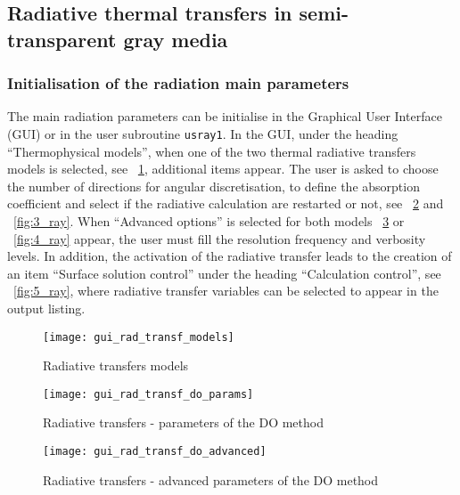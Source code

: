 {{\subsection{Radiative thermal transfers in semi-transparent gray media}
\subsubsection{Initialisation of the radiation main parameters}

The main radiation parameters can be initialise in the Graphical User Interface (GUI) or in the user subroutine \texttt{usray1}. In the GUI, under the heading ``Thermophysical models'', when one of the two thermal radiative transfers models is selected, see \figurename~\ref{fig:0_ray}, additional items appear. The user is asked to choose the number of directions for angular discretisation, to define the absorption coefficient and select if the radiative calculation are restarted or not, 
see \figurename~\ref{fig:1_ray} and \figurename~\ref{fig:3_ray}. When ``Advanced options'' is selected for both models \figurename~\ref{fig:2_ray} or \figurename~\ref{fig:4_ray} appear, the user must fill the resolution frequency and verbosity levels. In addition, the activation of the radiative transfer leads to the creation of an item ``Surface solution control'' under the heading ``Calculation control'', 
see \figurename~\ref{fig:5_ray}, where radiative transfer variables can be selected to appear in the output listing.

\begin{figure}[ht]
\begin{center}
\texttt{[image: gui\_rad\_transf\_models]}
\caption{Radiative transfers models}
\label{fig:0_ray}
\end{center}
\end{figure}

\begin{figure}[ht]
\begin{center}
\texttt{[image: gui\_rad\_transf\_do\_params]}
\caption{Radiative transfers - parameters of the DO method}
\label{fig:1_ray}
\end{center}
\end{figure}

\begin{figure}[ht]
\begin{center}
\texttt{[image: gui\_rad\_transf\_do\_advanced]}
\caption{Radiative transfers - advanced parameters of the DO method}
\label{fig:2_ray}
\end{center}
\end{figure}

}}

